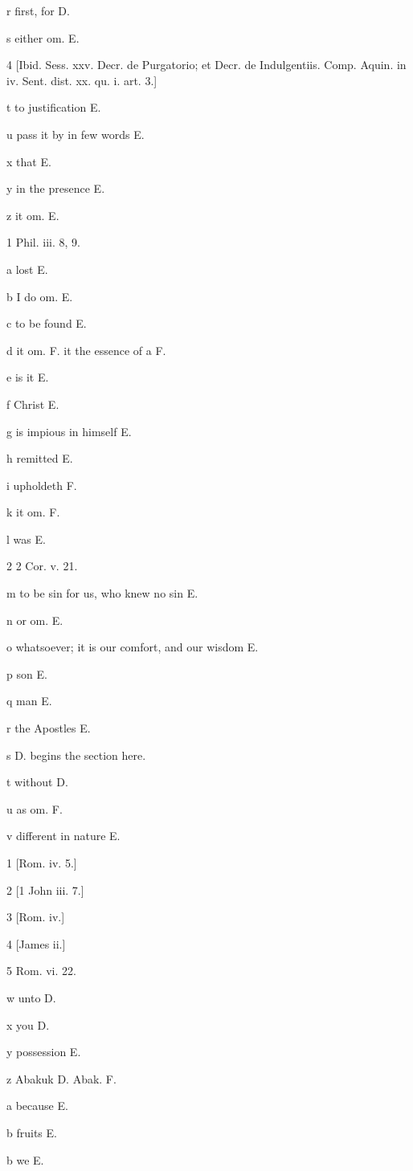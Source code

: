 r
first, for D.

s
either om. E.

4
[Ibid. Sess. xxv. Decr. de Purgatorio; et Decr. de Indulgentiis. Comp. Aquin. in iv. Sent. dist. xx. qu. i. art. 3.]

t
to justification E.

u
pass it by in few words E.

x
that E.

y
in the presence E.

z
it om. E.

1
Phil. iii. 8, 9.

a
lost E.

b
I do om. E.

c
to be found E.

d
it om. F. it the essence of a F.

e
is it E.

f
Christ E.

g
is impious in himself E.

h
remitted E.

i
upholdeth F.

k
it om. F.

l
was E.

2
2 Cor. v. 21.

m
to be sin for us, who knew no sin E.

n
or om. E.

o
whatsoever; it is our comfort, and our wisdom E.

p
son E.

q
man E.

r
the Apostles E.

s
D. begins the section here.

t
without D.

u
as om. F.

v
different in nature E.

1
[Rom. iv. 5.]

2
[1 John iii. 7.]

3
[Rom. iv.]

4
[James ii.]

5
Rom. vi. 22.

w
unto D.

x
you D.

y
possession E.

z
Abakuk D. Abak. F.

a
because E.

b
fruits E.

b
we E.

